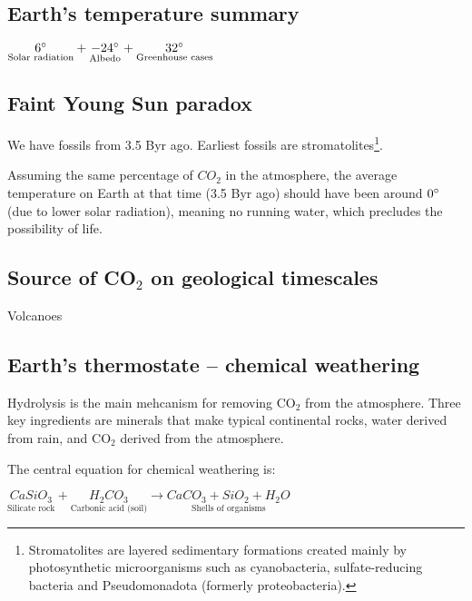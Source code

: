 \subsection{Earth's temperature summary}

$\underset{\text{Solar radiation}}{6 \degree} +
\underset{\text{Albedo}}{-24 \degree} +
\underset{\text{Greenhouse cases}}{32 \degree}$

\subsection{Faint Young Sun paradox}
We have fossils from 3.5 Byr ago. Earliest fossils are stromatolites\footnote{
Stromatolites are layered sedimentary formations created mainly by
photosynthetic microorganisms such as cyanobacteria, sulfate-reducing bacteria
and Pseudomonadota (formerly proteobacteria).
}.

Assuming the same percentage of $CO_2$ in the atmosphere, the average
temperature on Earth at that time (3.5 Byr ago) should have been around
$0 \degree$ (due to lower solar radiation), meaning no running water, which
precludes the possibility of life.

\subsection{Source of CO$_2$ on geological timescales}
Volcanoes

\subsection{Earth's thermostate -- chemical weathering}
Hydrolysis is the main mehcanism for removing CO$_2$ from the atmosphere.
Three key ingredients are minerals that make typical continental rocks, water
derived from rain, and CO$_2$ derived from the atmosphere.

The central equation for chemical weathering is:

$
\underset{\text{Silicate rock}}{CaSiO_3}
+
\underset{\text{Carbonic acid (soil)}}{H_2CO_3}
\rightarrow
\underset{\text{Shells of organisms}}{CaCO_3 + SiO_2 + H_2O}
$

